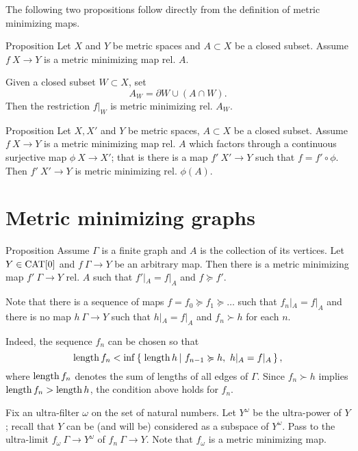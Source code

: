\documentclass[a4paper,10pt]{amsart}
\begin{document}
The following two propositions follow directly from the definition of metric minimizing maps.

\begin{thm}{Proposition}\label{prop:subset}
Let $X$ and $Y$ be metric spaces and $A\subset X$ be a closed subset.
Assume $f\:X\to Y$ is a metric minimizing map rel. $A$.

Given a closed subset $W\subset X$, set 
\[A_W=\partial W\cup (A\cap W).\]
Then the restriction $f|_W$ is metric minimizing rel. $A_W$.
\end{thm}

\begin{thm}{Proposition}\label{prop:factor}
Let $X, X'$ and $Y$ be metric spaces, 
$A\subset X$ be a closed subset.
Assume $f\:X\to Y$ is a metric minimizing map rel. $A$
which factors through a continuous surjective map $\phi\:X\to X'$;
that is there is a map $f'\:X'\to Y$ such that $f=f'\circ\phi$.
Then $f'\:X'\to Y$ is metric minimizing rel. $\phi(A)$.
\end{thm}

\section{Metric minimizing graphs}



\begin{thm}{Proposition}
Assume $\Gamma$ is a  finite graph and $A$ is the collection of its vertices.
Let $Y\in\mathop{\rm CAT}\nolimits[0]$ and $f\:\Gamma\to Y$ be an arbitrary map.
Then there is a metric minimizing map $f'\:\Gamma\to Y$ rel. $A$ such that
$f'|_A=f|_A$ and 
$f\succcurlyeq f'$.
\end{thm} 

 Note that there is a sequence of maps $f=f_0\succcurlyeq f_1\succcurlyeq\dots$ such that $f_n|_A=f|_A$ and there is no map $h\:\Gamma\to Y$ such that $h|_A=f|_A$ and $f_n\succ h$ for each $n$.

Indeed, the sequence $f_n$ can be chosen so that
\[\length f_n<\inf\set{\length h}{f_{n-1}\succcurlyeq h,\ h|_A=f|_A},\]
where $\mathop{\rm length}\nolimits f_n$ denotes the sum of lengths of all edges of $\Gamma$. %
Since $f_n\succ h$ implies $\mathop{\rm length}\nolimits f_n>\mathop{\rm length}\nolimits h$, 
the condition above holds for $f_n$.

Fix an ultra-filter $\omega$ on the set of natural numbers.
Let $Y^\omega$ be the ultra-power of $Y$;
recall that $Y$ can be (and will be) considered as a subspace of $Y^\omega$.
Pass to the ultra-limit $f_\omega\:\Gamma\to Y^\omega$ 
of $f_n\:\Gamma\to Y$.
Note that $f_\omega$ is a metric minimizing map.
\end{document}
